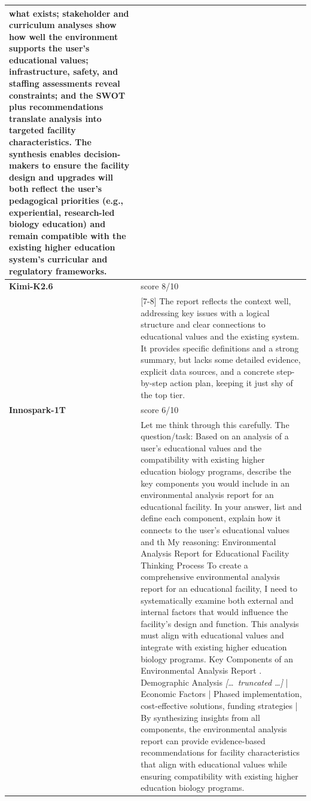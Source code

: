 \begin{longtable}{@{}l p{12.5cm}@{}}
what exists; stakeholder and curriculum analyses show how well the environment supports the user's educational values; infrastructure, safety, and staffing assessments reveal constraints; and the SWOT plus recommendations translate analysis into targeted facility characteristics. The synthesis enables decision-makers to ensure the facility design and upgrades will both reflect the user's pedagogical priorities (e.g., experiential, research-led biology education) and remain compatible with the existing higher education system's curricular and regulatory frameworks. \\
  \midrule
  \textbf{Kimi-K2.6} & score 8/10 \\
  & [7-8] The report reflects the context well, addressing key issues with a logical structure and clear connections to educational values and the existing system. It provides specific definitions and a strong summary, but lacks some detailed evidence, explicit data sources, and a concrete step-by-step action plan, keeping it just shy of the top tier. \\
  \textbf{Innospark-1T} & score 6/10 \\
  & Let me think through this carefully. \newline The question/task: Based on an analysis of a user's educational values and the compatibility with existing higher education biology programs, describe the key components you would include in an environmental analysis report for an educational facility. In your answer, list and define each component, explain how it connects to the user's educational values and th \newline My reasoning: Environmental Analysis Report for Educational Facility \newline Thinking Process \newline To create a comprehensive environmental analysis report for an educational facility, I need to systematically examine both external and internal factors that would influence the facility's design and function. This analysis must align with educational values and integrate with existing higher education biology programs. Key Components of an Environmental Analysis Report \newline 1. Demographic Analysis \newline \textit{[\ldots\ truncated \ldots]} \newline | Economic Factors | Phased implementation, cost-effective solutions, funding strategies | \newline By synthesizing insights from all components, the environmental analysis report can provide evidence-based recommendations for facility characteristics that align with educational values while ensuring compatibility with existing higher education biology programs. \\

\end{longtable}
